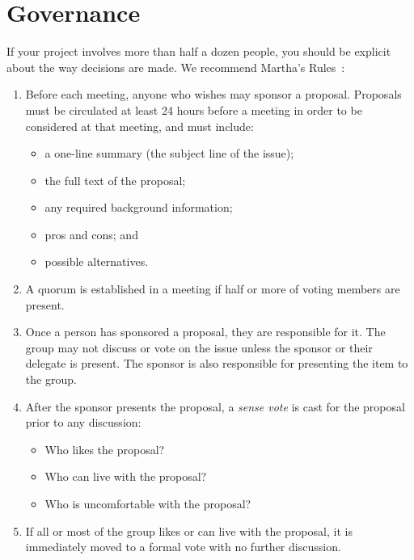 \section{Governance}\label{s:collab-governance}

If your project involves more than half a dozen people,
you should be explicit about the way decisions are made.
We recommend Martha's Rules~\cite{Mina1986}:

\begin{enumerate}

\item
  Before each meeting, anyone who wishes may sponsor a proposal.  Proposals must
  be circulated at least 24 hours before a meeting in order to be considered at
  that meeting, and must include:

  \begin{itemize}
  \item a one-line summary (the subject line of the issue);
  \item the full text of the proposal;
  \item any required background information;
  \item pros and cons; and
  \item possible alternatives.
  \end{itemize}

\item
  A quorum is established in a meeting if half or more of voting members are
  present.

\item
  Once a person has sponsored a proposal, they are responsible for it.  The
  group may not discuss or vote on the issue unless the sponsor or their
  delegate is present.  The sponsor is also responsible for presenting the item
  to the group.

\item
  After the sponsor presents the proposal, a \emph{sense vote} is cast for the
  proposal prior to any discussion:

  \begin{itemize}
  \item Who likes the proposal?
  \item Who can live with the proposal?
  \item Who is uncomfortable with the proposal?
  \end{itemize}

\item
  If all or most of the group likes or can live with the proposal, it is
  immediately moved to a formal vote with no further discussion.


\end{enumerate}
